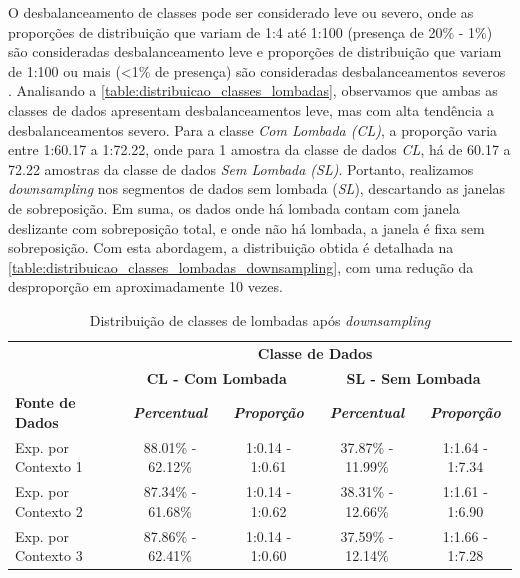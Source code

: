 O desbalanceamento de classes pode ser considerado leve ou severo, onde as proporções de distribuição que variam de 1:4 até 1:100 (presença de 20\% - 1\%) são consideradas desbalanceamento leve e proporções de distribuição que variam de 1:100 ou mais (<1\% de presença) são consideradas desbalanceamentos severos \cite{Krawczyk2016,Brownlee2020}. Analisando a \autoref{table:distribuicao_classes_lombadas}, observamos que ambas as classes de dados apresentam desbalanceamentos leve, mas com alta tendência a desbalanceamentos severo. Para a classe \emph{Com Lombada (CL)}, a proporção varia entre 1:60.17 a 1:72.22, onde para 1 amostra da classe de dados \emph{CL}, há de 60.17 a 72.22 amostras da classe de dados \emph{Sem Lombada (SL)}. Portanto, realizamos \textit{downsampling} nos segmentos de dados sem lombada (\emph{SL}), descartando as janelas de sobreposição. Em suma, os dados onde há lombada contam com janela deslizante com sobreposição total, e onde não há lombada, a janela é fixa sem sobreposição. Com esta abordagem, a distribuição obtida é detalhada na \autoref{table:distribuicao_classes_lombadas_downsampling}, com uma redução da desproporção em aproximadamente 10 vezes.

\begin{table}[h]
\caption{Distribuição de classes de lombadas após \textit{downsampling}}
\label{table:distribuicao_classes_lombadas_downsampling}
\centering
\scriptsize
\begin{tabular}{lcccc}
\cmidrule(l){2-5}
\multicolumn{1}{c}{\multirow{2}{*}{\textbf{}}} & 
\multicolumn{4}{c}{\textbf{Classe de Dados}} \\ \cmidrule(l){2-5} 
\multicolumn{1}{c}{} & 
\multicolumn{2}{c}{\textbf{CL - Com Lombada}} & 
\multicolumn{2}{c}{\textbf{SL - Sem Lombada}} \\ \midrule
\textbf{Fonte de Dados} & 
\textit{\textbf{Percentual}} & 
\textit{\textbf{Proporção}} & 
\textit{\textbf{Percentual}} & 
\textit{\textbf{Proporção}} \\ \midrule
Exp. por Contexto 1 & 88.01\% - 62.12\% & 1:0.14 - 1:0.61 & 37.87\% - 11.99\% & 1:1.64 - 1:7.34 \\ \midrule
Exp. por Contexto 2 & 87.34\% - 61.68\% & 1:0.14 - 1:0.62 & 38.31\% - 12.66\% & 1:1.61 - 1:6.90 \\ \midrule
Exp. por Contexto 3 & 87.86\% - 62.41\% & 1:0.14 - 1:0.60 & 37.59\% - 12.14\% & 1:1.66 - 1:7.28 \\ \bottomrule
\end{tabular}
\end{table}

